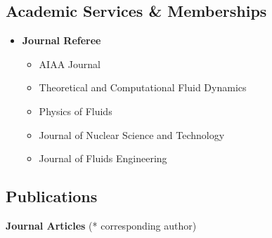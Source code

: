 \documentclass[10pt]{article}
\newenvironment{myitemize}
{ \begin{itemize}
    \setlength{\itemsep}{0pt}
    \setlength{\parskip}{0pt}
    \setlength{\parsep}{0pt}     }
{ \end{itemize}                  }
\begin{document}
\vspace{-0.1in}
\subsection*{Academic Services \& Memberships}
\begin{itemize}

\item {\bf Journal Referee}
	\begin{myitemize}
	\item AIAA Journal
 \item Theoretical and Computational Fluid Dynamics
	\item Physics of Fluids
	\item Journal of Nuclear Science and Technology
	\item Journal of Fluids Engineering

	\end{myitemize}
		\vspace{-0.1in}
		
\end{itemize}

\vspace{-0.1in}

\subsection*{Publications}
{\bf \color{Blue}Journal Articles} (*  corresponding author)
\end{document}

